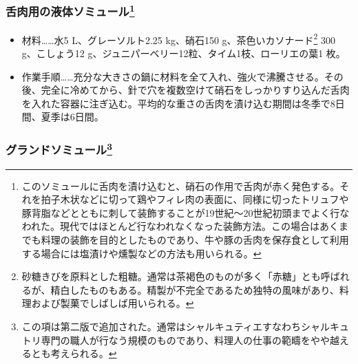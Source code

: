 \begin{recette}
\atoaki{}

\hypertarget{saumure-liquide-pour-langues}{%
\subsubsection[舌肉用の液体ソミュール]{\texorpdfstring{舌肉用の液体ソミュール\footnote{このソミュールに舌肉を漬け込むと、硝石の作用で舌肉が赤く発色する。それを拍子木状などに切って鶏やフィレ肉の表面に、同様に切ったトリュフや豚背脂などとともに刺して装飾することが19世紀〜20世紀初頭までよく行なわれた。現代ではほとんど行なわれなくなった装飾方法。この場合はあくまでも料理の装飾を目的としたものであり、牛や豚の舌肉を保存食として利用する場合には塩漬けや燻製などの方法も用いられる。}}{舌肉用の液体ソミュール}}\label{saumure-liquide-pour-langues}}



\begin{itemize}
\item
  材料\ldots{}\ldots{}水5 L、グレーソルト2.25 kg、硝石150
  g、茶色いカソナード\footnote{砂糖きびを原料とした粗糖。通常は茶褐色のものが多く「赤糖」とも呼ばれるが、精白したものもある。精製が不完全であるため独特の風味があり、料理および製菓でしばしば用いられる。}
  300 g、こしょう12 g、ジュニパーベリー12粒、タイム1枝、ローリエの葉1
  枚。
\item
  作業手順\ldots{}\ldots{}充分な大きさの鍋に材料を全て入れ、強火で沸騰させる。その後、完全に冷めてから、針で穴を複数空けて硝石をしっかりすり込んだ舌肉を入れた容器に注ぎ込む。平均的な重さの舌肉を漬け込む期間は冬季で8日間、夏季は6日間。
\end{itemize}

\atoaki{}

\hypertarget{grande-saumure}{%
\subsubsection[グランドソミュール]{\texorpdfstring{グランドソミュール\footnote{この項は第二版で追加された。通常はシャルキュティエすなわちシャルキュトリ専門の職人が行なう規模のものであり、料理人の仕事の範疇をやや越えるとも考えられる。}}{グランドソミュール}}\label{grande-saumure}}




\end{recette}

